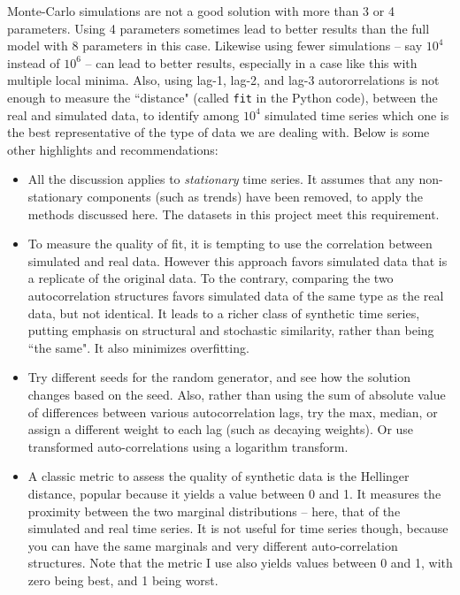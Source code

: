 \documentclass[oneside,10pt]{book}
\begin{document}
Monte-Carlo simulations are not a good solution with more than 3 or 4 parameters. Using 4 parameters sometimes lead to better results than the full model with 8 parameters in this case. Likewise using fewer simulations -- say $10^4$ instead of $10^6$ -- can lead to better results, especially in a case like this with multiple local minima. Also, using lag-1, lag-2, and lag-3 autororrelations is not enough to measure the ``distance" (called \texttt{fit} in the Python code), between the real and simulated data, to identify among $10^4$
simulated time series which one is the best representative of the type of data we are dealing with. Below is some other highlights and recommendations:\vspace{1ex}
\begin{itemize}
\item All the discussion applies to {\em stationary} time series. It assumes that any \textcolor{index}{non-stationary} components (such as trends) have been removed, to apply the methods discussed here. The datasets in this project meet this requirement.
\item To measure the quality of fit, it is tempting to use the correlation between simulated and real data. However this approach favors simulated data that is a replicate of the original data. To the contrary, comparing the two autocorrelation structures favors simulated data of the same type as the real data, but not identical. It leads to a richer class of synthetic time series, putting emphasis on structural and stochastic 
 similarity, rather than being ``the same". It also minimizes \textcolor{index}{overfitting}. 
\item Try different seeds for the random generator, and see how the solution changes based on the seed. Also, rather than using the sum of absolute value of differences between various \textcolor{index}{autocorrelation lags}, try the max, median, or assign a different weight to each lag (such as decaying weights). Or use transformed auto-correlations using a logarithm transform.
\item A classic metric to assess the quality of synthetic data is the \textcolor{index}{Hellinger distance}, popular because it yields a value between 0 and 1. It measures the proximity between the two marginal distributions -- here, that of the simulated and real time series. It is not useful for time series though, because you can have the same marginals and very different auto-correlation structures. Note that the metric I use also yields values between 0 and 1, with zero being best, and 1 being worst.

\end{itemize}
\end{document}
